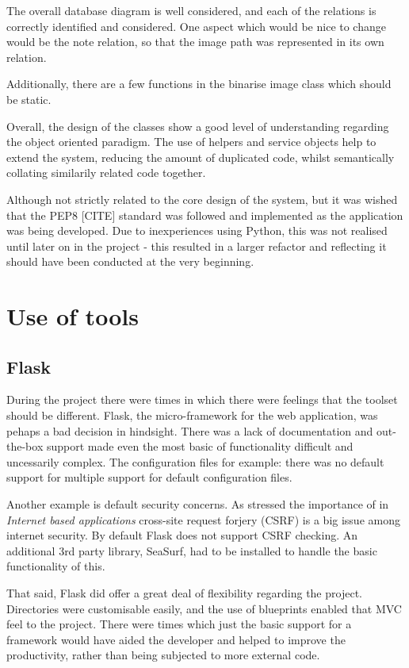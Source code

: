 The overall database diagram is well considered, and each of the relations is correctly identified and considered. One aspect which would be nice to change would be the note relation, so that the image path was represented in its own relation.

Additionally, there are a few functions in the binarise image class which should be static.

Overall, the design of the classes show a good level of understanding regarding the object oriented paradigm. The use of helpers and service objects help to extend the system, reducing the amount of duplicated code, whilst semantically collating similarily related code together.

Although not strictly related to the core design of the system, but it was wished that the PEP8 [CITE] standard was followed and implemented as the application was being developed. Due to inexperiences using Python, this was not realised until later on in the project - this resulted in a larger refactor and reflecting it should have been conducted at the very beginning.

\section{Use of tools}
\subsection{Flask}
During the project there were times in which there were feelings that the toolset should be different. Flask, the micro-framework for the web application, was pehaps a bad decision in hindsight. There was a lack of documentation and out-the-box support made even the most basic of functionality difficult and uncessarily complex. The configuration files for example: there was no default support for multiple support for default configuration files.

Another example is default security concerns. As stressed the importance of in \textit{Internet based applications} cross-site request forjery (CSRF) is a big issue among internet security. By default Flask does not support CSRF checking. An additional 3rd party library, SeaSurf, had to be installed to handle the basic functionality of this.

That said, Flask did offer a great deal of flexibility regarding the project. Directories were customisable easily, and the use of blueprints enabled that MVC feel to the project. There were times which just the basic support for a framework would have aided the developer and helped to improve the productivity, rather than being subjected to more external code.
